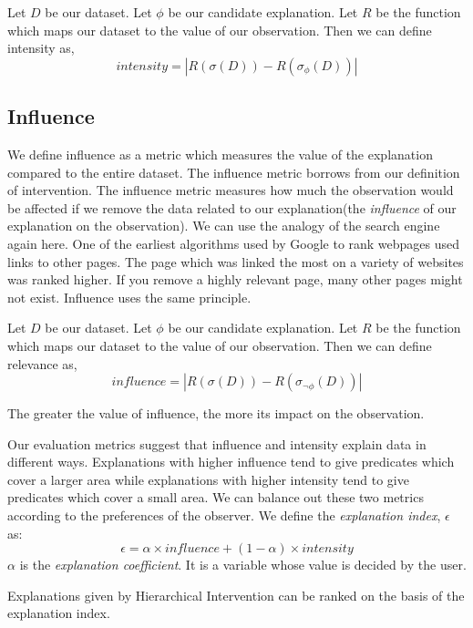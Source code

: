 Let $D$ be our dataset. Let $\phi$ be our candidate explanation. Let $R$ be the function which maps our dataset to the value of our observation. Then we can define intensity as,
$$intensity = |R(\sigma (D)) - R(\sigma_\phi (D))|$$

\subsection{Influence}
\label{sec:influence}
We define influence as a metric which measures the value of the explanation compared to the entire dataset. The influence metric borrows from our definition of intervention. The influence metric measures how much the observation would be affected if we remove the data related to our explanation(the \textit{influence} of our explanation on the observation). We can use the analogy of the search engine again here. One of the earliest algorithms used by Google to rank webpages used links to other pages\citep{brin1998anatomy}. The page which was linked the most on a variety of websites was ranked higher. If you remove a highly relevant page, many other pages might not exist. Influence uses the same principle.

Let $D$ be our dataset. Let $\phi$ be our candidate explanation. Let $R$ be the function which maps our dataset to the value of our observation. Then we can define relevance as,
$$influence = |R(\sigma(D)) - R(\sigma_{\neg \phi} (D)) |$$

The greater the value of influence, the more its impact on the observation.

Our evaluation metrics suggest that influence and intensity explain data in different ways. Explanations with higher influence tend to give predicates which cover a larger area while explanations with higher intensity tend to give predicates which cover a small area. We can balance out these two metrics according to the preferences of the observer. We define the \textit{explanation index}, $\epsilon$ as:
$$\epsilon = \alpha \times influence + (1-\alpha) \times intensity$$
$\alpha$ is the \textit{explanation coefficient}. It is a variable whose value is decided by the user.

Explanations given by Hierarchical Intervention can be ranked on the basis of the explanation index.



